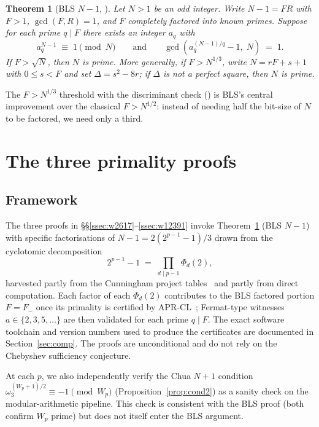 \documentclass[11pt,a4paper]{amsart}
\theoremstyle{plain}
\newtheorem{theorem}{Theorem}[section]
\theoremstyle{definition}
\newcommand{\wom}{\omega_3}
\begin{document}
\begin{theorem}[BLS $N-1$, {\cite[Theorem~5; strengthened form, Theorem~11]{BLS75}}]
\label{thm:BLSN-1}
Let $N > 1$ be an odd integer. Write $N - 1 = F R$ with $F > 1$,
$\gcd(F, R) = 1$, and $F$ completely factored into known primes.
Suppose for each prime $q \mid F$ there exists an integer $a_q$ with
\[
  a_q^{N-1} \;\equiv\; 1 \pmod N \qquad\text{and}\qquad
  \gcd(a_q^{(N-1)/q} - 1,\; N) \;=\; 1.
\]
If $F > \sqrt N$, then $N$ is prime. More generally, if $F > N^{1/3}$,
write $N = r F + s + 1$ with $0 \leq s < F$ and set
$\Delta = s^2 - 8 r$; if $\Delta$ is not a perfect square, then $N$ is
prime.
\end{theorem}

The $F > N^{1/3}$ threshold with the discriminant check
(\cite[Theorem~11]{BLS75}) is BLS's central improvement over the
classical $F > N^{1/2}$: instead of needing half the bit-size of $N$
to be factored, we need only a third.

\section{The three primality proofs}
\label{sec:proofs}

\subsection{Framework}

The three proofs in \S\S\ref{ssec:w2617}--\ref{ssec:w12391} invoke
Theorem~\ref{thm:BLSN-1} (BLS $N - 1$) with specific factorisations of
$N - 1 = 2(2^{p-1} - 1)/3$ drawn from the cyclotomic decomposition
\[
  2^{p-1} - 1 \;=\; \prod_{d \mid p - 1} \Phi_d(2),
\]
harvested partly from the Cunningham project tables~\cite{Cunningham}
and partly from direct computation. Each factor of each $\Phi_d(2)$
contributes to the BLS factored portion $F = F_-$ once its primality
is certified by APR-CL~\cite{APR,CohenLenstra}; Fermat-type witnesses
$a \in \{2, 3, 5, \ldots\}$ are then validated for each prime $q \mid
F$. The exact software toolchain and version numbers used to produce
the certificates are documented in Section~\ref{sec:comp}. The proofs
are unconditional and do not rely on the Chebyshev sufficiency
conjecture.

At each $p$, we also independently verify the Chua $N + 1$ condition
$\wom^{(W_p + 1)/2} \equiv -1 \pmod{W_p}$
(Proposition~\ref{prop:cond2}) as a sanity check on the
modular-arithmetic pipeline. This check is consistent with the BLS
proof (both confirm $W_p$ prime) but does not itself enter the BLS
argument.
\end{document}
